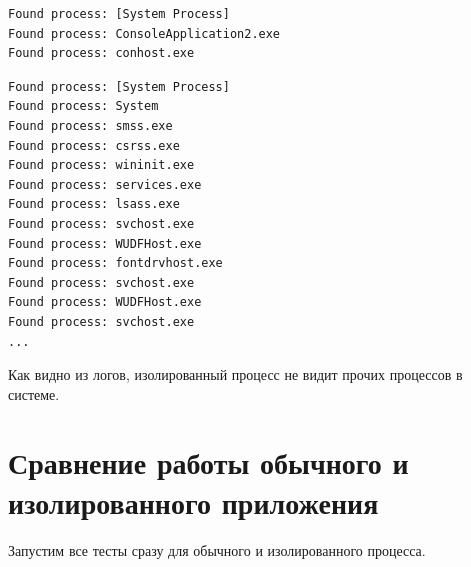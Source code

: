 \begin{lstlisting}[language={}, caption={Список процессов из изолированного процесса}]
Found process: [System Process]
Found process: ConsoleApplication2.exe
Found process: conhost.exe
\end{lstlisting}
\begin{lstlisting}[language={}, caption={Список процессов из обычного процесса}]
Found process: [System Process]
Found process: System
Found process: smss.exe
Found process: csrss.exe
Found process: wininit.exe
Found process: services.exe
Found process: lsass.exe
Found process: svchost.exe
Found process: WUDFHost.exe
Found process: fontdrvhost.exe
Found process: svchost.exe
Found process: WUDFHost.exe
Found process: svchost.exe
...
\end{lstlisting}
Как видно из логов, изолированный процесс не видит прочих процессов в системе.


\section{Сравнение работы обычного и изолированного приложения}
Запустим все тесты сразу для обычного и изолированного процесса.

